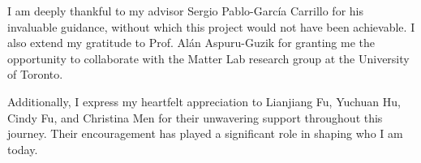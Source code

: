 I am deeply thankful to my advisor Sergio Pablo-García Carrillo for his invaluable guidance, without which this project would not have been achievable. I also extend my gratitude to Prof. Alán Aspuru-Guzik for granting me the opportunity to collaborate with the Matter Lab research group at the University of Toronto.

Additionally, I express my heartfelt appreciation to Lianjiang Fu, Yuchuan Hu, Cindy Fu, and Christina Men for their unwavering support throughout this journey. Their encouragement has played a significant role in shaping who I am today.